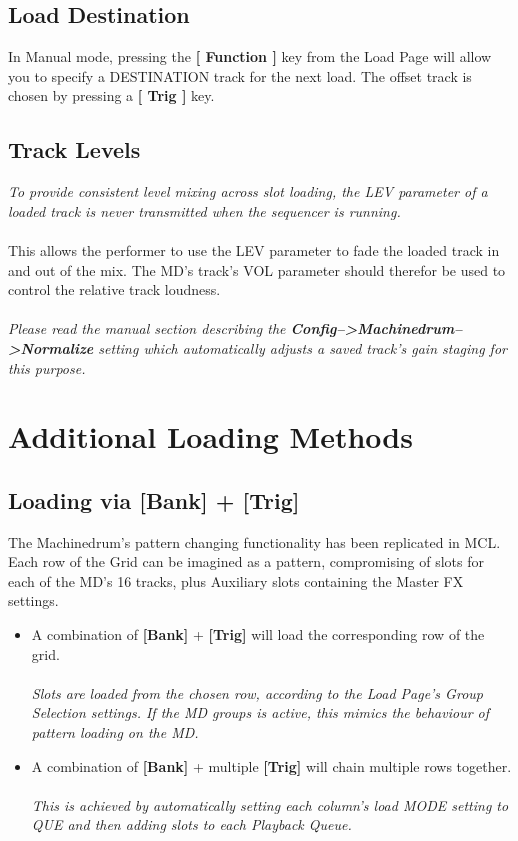 \section{Load Destination}
In Manual mode, pressing the \textbf{[ Function ]} key from the Load Page will allow you to specify a DESTINATION track for the next load. The offset track is chosen by pressing a \textbf{[ Trig ]} key.
\section{Track Levels}
\textit{To provide consistent level mixing across slot loading, the LEV parameter of a loaded track is never transmitted when the sequencer is running.}\\\\This allows the performer to use the LEV parameter to fade the loaded track in and out of the mix. The MD's track's VOL parameter should therefor be used to control the relative track loudness.\\\\
\textit{Please read the manual section describing the \textbf{Config-->Machinedrum-->Normalize} setting which automatically adjusts a saved track's gain staging for this purpose.}

\chapter{Additional Loading Methods}
\section{Loading via [Bank] + [Trig]}
The Machinedrum's pattern changing functionality has been replicated in MCL. Each row of the Grid can be imagined as a pattern, compromising of slots for each of the MD's 16 tracks, plus Auxiliary slots containing the Master FX settings.

\begin{itemize}
   \item A combination of \textbf{[Bank]} + \textbf{[Trig]} will load the corresponding row of the grid.\\\\ \textit{Slots are loaded from the chosen row, according to the Load Page's Group Selection settings. If the MD groups is active, this mimics the behaviour of pattern loading on the MD.}
   \item A combination of \textbf{[Bank]} + multiple \textbf{[Trig]} will chain multiple rows together.\\\\\textit{This is achieved by automatically setting each column's load MODE setting to QUE and then adding slots to each Playback Queue.}
\end{itemize}
